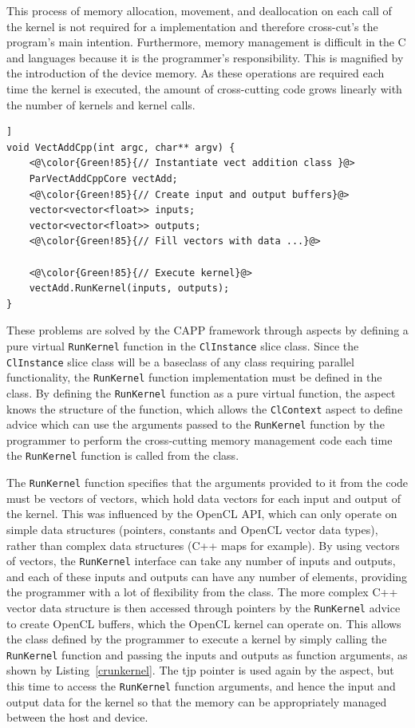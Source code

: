 \documentclass{sig-alternate-05-2015}
\begin{document}
This process of memory allocation, movement, and
deallocation on each call of the kernel is not required for a \CPP implementation
and therefore cross-cut's the program's main intention. Furthermore, memory management 
is difficult in the C and \CPP languages because it is the programmer's
responsibility. This is magnified by the introduction of the device memory. 
As these operations are required each 
time the kernel is executed, the amount of cross-cutting code grows linearly 
with the number of kernels and kernel calls. 

\begin{lstlisting}[caption=Execution of a parallel kernel from a \CPP class.,label=crunkernel,float=[!t]]
void VectAddCpp(int argc, char** argv) {
	<@\color{Green!85}{// Instantiate vect addition class }@>
	ParVectAddCppCore vectAdd;
	<@\color{Green!85}{// Create input and output buffers}@>
	vector<vector<float>> inputs;
	vector<vector<float>> outputs;
	<@\color{Green!85}{// Fill vectors with data ...}@>
  
	<@\color{Green!85}{// Execute kernel}@>
	vectAdd.RunKernel(inputs, outputs);
}
\end{lstlisting}

These problems are solved by the CAPP framework through aspects by defining
a pure virtual \lstinline$RunKernel$ function in the \lstinline$ClInstance$ slice class. 
Since the \lstinline$ClInstance$ slice class will be a baseclass of any \CPP class requiring parallel 
functionality, the \lstinline$RunKernel$ function implementation must be defined in the 
\CPP class. By defining the \lstinline$RunKernel$ function as a pure virtual
function, the aspect knows the structure of the function, which allows the 
\lstinline$ClContext$ aspect to define advice which can use the arguments passed to
the \lstinline$RunKernel$ function by the programmer to perform the cross-cutting 
memory management code each time the \lstinline$RunKernel$ function is called from
the \CPP class.

The \lstinline$RunKernel$ function specifies that the arguments provided to it from the
\CPP code must be vectors of vectors, which hold data vectors for each input and
output of the kernel. This was influenced by the OpenCL API, which can only
operate on simple data structures (pointers, constants and OpenCL vector data
types), rather than complex data structures (C++ maps for example). 
By using vectors of vectors, the \lstinline$RunKernel$ interface can take any 
number of inputs and outputs, and each of these inputs and outputs can have any
number of elements, providing the programmer with a lot of flexibility from the
\CPP class. The more complex C++ vector data structure is then accessed through
pointers by the \lstinline$RunKernel$ advice to create OpenCL buffers, which the OpenCL kernel 
can operate on. This allows the \CPP class defined 
by the programmer to execute a kernel by simply calling the \lstinline$RunKernel$ function and 
passing the inputs and outputs as function arguments, as shown by Listing~\ref{crunkernel}. 
The tjp pointer is  used again by the aspect, but this time to access the \lstinline$RunKernel$ 
function arguments, and hence the input and output data for the kernel so that the memory can be
appropriately managed between the host and device.
\end{document}
